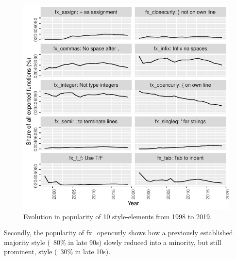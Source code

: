 \begin{figure}[htbp]
  \centering
  \includegraphics{fig1}
  \caption{Evolution in popularity of 10 style-elements from 1998 to 2019.}
  \label{figure:fig1}
\end{figure}


Secondly, the popularity of fx\_opencurly shows how a previously established majority style (~80\% in late 90s) slowly reduced into a minority, but still prominent, style (~30\% in late 10s).


